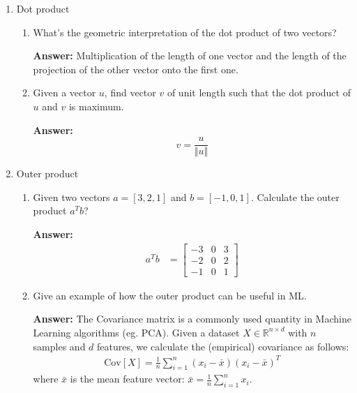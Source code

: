 \documentclass{article}
\newenvironment{QandA}{\begin{enumerate}[label=\arabic*.]}{\end{enumerate}}
\newenvironment{InnerQandA}{\begin{enumerate}[label=\roman*.]}{\end{enumerate}}
\newenvironment{answer}{\par\normalfont \textbf{Answer:}}{}
\newcommand{\R}{\mathbb{R}}
\newcommand{\Cov}[1]{\text{Cov}\left[ #1 \right]}
\begin{document}
\begin{QandA}
    \item Dot product
    \begin{InnerQandA}
        \item What’s the geometric interpretation of the dot product of two vectors?
        \begin{answer}
            Multiplication of the length of one vector and the length of the projection of the other vector onto the first one.
        \end{answer}
        
        \item Given a vector $u$, find vector $v$ of unit length such that the dot product of $u$ and $v$ is maximum.
        \begin{answer}
            $$v = \frac{u}{\Vert u \Vert}$$
        \end{answer}
    \end{InnerQandA}

    \item Outer product
    \begin{InnerQandA}
        \item Given two vectors $a=[3,2,1]$ and $b=[-1,0,1]$. Calculate the outer product $a^T b$?  
        \begin{answer}
            \begin{align*}
                a^T b &= \begin{bmatrix}
                -3 & 0 & 3\\
                -2 & 0 & 2 \\
                -1 & 0 & 1
                \end{bmatrix}
            \end{align*}
        \end{answer}
        
        \item Give an example of how the outer product can be useful in ML.
        \begin{answer}
            The Covariance matrix is a commonly used quantity in Machine Learning algorithms (eg. PCA). Given a dataset $X \in \R^{n \times d}$ with $n$ samples and $d$ features, we calculate the (empirical) covariance as follows:
            \begin{align*}
                \Cov{X} = \frac{1}{n} \sum_{i=1}^n (x_i - \bar{x}) (x_i - \bar{x})^T
            \end{align*}
            where $\bar{x}$ is the mean feature vector: $\bar{x} = \frac{1}{n} \sum_{i=1}^n x_i$. 
        \end{answer}
    \end{InnerQandA}
    

\end{QandA}
\end{document}
